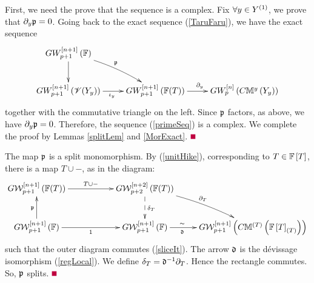 \documentclass[12pt]{article}
\begin{document}
\eT
\pf First, we need the prove that the sequence is a complex. 
Fix $\forall y\in Y^{\left( 1\right)}$, we prove that $\partial_y \mathfrak {p}=0$. 
Going back to the exact sequence (\ref{TaruFaru}), we have the exact sequence
\begin{equation}\label{Goingkal}
\diagram 
GW^{\LRt{n+1}}_{p+1}\LRf{{\BF}}\ar[d]\ar@/^/[dr]^{\p}&&\\
GW_{p+1}^{\LRt{n+1}}\LRf{{\SV}(Y_y)}\ar[r]_{\iota_y} & GW_{p+1}^{\LRt{n+1}}\LRf{{\BF}(T)}
\ar[r]^{\partial_y} & GW_p^{\LRt{n}}\LRf{C{\BM}^y\LRf{Y_y}}\\
\enddiagram 
\end{equation}
together with the commutative triangle on the left. 
Since $\mathfrak {p}$ factors, as above, we have $\partial_y\mathfrak {p}=0$. 
 Therefore, the sequence (\ref{primeSeq}) is a complex.  We complete the proof by Lemmas \ref{splitLem} and  \ref{MorExact}. $\eop$ 



\bL\label{splitLem}{\rm 
The map $\mathfrak {p}$ is a split monomorphism. 
}
\eL 
%
\pf  %
 By (\ref{unitHike}),  corresponding to $T\in {\mathbb{F}}\left[ T\right]$,  there is a map $T\cup -$, as in the  
 diagram:
\begin{equation}\label{alphaDia}
\diagram 
G{\CW}^{\LRt{n+1}}_{p+1}\LRf{{\BF}(T)} \ar[rr]^{T \cup -} && G{\CW}^{\LRt{n+2}}_{p+2}\LRf{{\BF}(T)}
\ar@{-->}[d]^{\delta_T} \ar@/^/[dr]^{\partial_T}&\\
G{\CW}^{\LRt{n+1}}_{p+1}\LRf{{\BF}} \ar[u]^{\p}\ar[rr]_1&& G{\CW}^{\LRt{n+1}}_{p+1}\LRf{{\BF}} 
\ar[r]_{\d\qquad\qquad}^{\sim\qquad\qquad }&
G{\CW}^{\LRt{n+1}}_{p+1}\LRf{C{\BM}^{(T)}\LRf{{\BF}\LRt{T}_{(T)}}}\\
\enddiagram 
\end{equation} 
such that the outer diagram commutes (\ref{sliceIt}). 
The  arrow  $\mathfrak {d}$ is the  d\'{e}vissage isomorphism (\ref{regLocal}). We define  $\delta_T= \mathfrak {d}^{-1}\partial_T$. 
Hence the rectangle commutes.  So, $\mathfrak {p}$ splits. $\eop$ 
\end{document}
